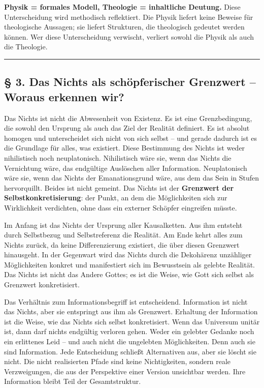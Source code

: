 \documentclass[
  ngerman,
]{article}
\begin{document}
\textbf{Physik = formales Modell, Theologie = inhaltliche Deutung.}
Diese Unterscheidung wird methodisch reflektiert. Die Physik liefert
keine Beweise für theologische Aussagen; sie liefert Strukturen, die
theologisch gedeutet werden können. Wer diese Unterscheidung verwischt,
verliert sowohl die Physik als auch die Theologie.

\begin{center}\rule{0.5\linewidth}{0.5pt}\end{center}

\subsection{§ 3. Das Nichts als schöpferischer Grenzwert -- Woraus
erkennen
wir?}\label{das-nichts-als-schuxf6pferischer-grenzwert-woraus-erkennen-wir}

Das Nichts ist nicht die Abwesenheit von Existenz. Es ist eine
Grenzbedingung, die sowohl den Ursprung als auch das Ziel der Realität
definiert. Es ist absolut homogen und unterscheidet sich nicht von sich
selbst -- und gerade dadurch ist es die Grundlage für alles, was
existiert. Diese Bestimmung des Nichts ist weder nihilistisch noch
neuplatonisch. Nihilistisch wäre sie, wenn das Nichts die Vernichtung
wäre, das endgültige Auslöschen aller Information. Neuplatonisch wäre
sie, wenn das Nichts der Emanationsgrund wäre, aus dem das Sein in
Stufen hervorquillt. Beides ist nicht gemeint. Das Nichts ist der
\textbf{Grenzwert der Selbstkonkretisierung}: der Punkt, an dem die
Möglichkeiten sich zur Wirklichkeit verdichten, ohne dass ein externer
Schöpfer eingreifen müsste.

Im Anfang ist das Nichts der Ursprung aller Kausalketten. Aus ihm
entsteht durch Selbstbezug und Selbstreferenz die Realität. Am Ende
kehrt alles zum Nichts zurück, da keine Differenzierung existiert, die
über diesen Grenzwert hinausgeht. In der Gegenwart wird das Nichts durch
die Dekohärenz unzähliger Möglichkeiten konkret und manifestiert sich im
Bewusstsein als gelebte Realität. Das Nichts ist nicht das Andere
Gottes; es ist die Weise, wie Gott sich selbst als Grenzwert
konkretisiert.

Das Verhältnis zum Informationsbegriff ist entscheidend. Information ist
nicht das Nichts, aber sie entspringt aus ihm als Grenzwert. Erhaltung
der Information ist die Weise, wie das Nichts sich selbst konkretisiert.
Wenn das Universum unitär ist, dann darf nichts endgültig verloren
gehen. Weder ein gelebter Gedanke noch ein erlittenes Leid -- und auch
nicht die ungelebten Möglichkeiten. Denn auch sie sind Information. Jede
Entscheidung schließt Alternativen aus, aber sie löscht sie nicht. Die
nicht realisierten Pfade sind keine Nichtigkeiten, sondern reale
Verzweigungen, die aus der Perspektive einer Version unsichtbar werden.
Ihre Information bleibt Teil der Gesamtstruktur.
\end{document}
